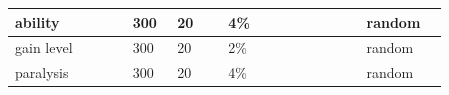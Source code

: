 \begin{longtable}{|>{\RaggedRight}p{0.23462\linewidth}|>{\RaggedRight}p{0.08075\linewidth}|>{\RaggedRight}p{0.10890\linewidth}|>{\RaggedRight}p{0.27027\linewidth}|>{\RaggedRight}p{0.16262\linewidth}|}
ability\footnotemark[71]&\hspace*{0pt}\ignorespaces{}\hspace*{0pt}300&\hspace*{0pt}\ignorespaces{}\hspace*{0pt}20&\hspace*{0pt}\ignorespaces{}\hspace*{0pt}4\%&\hspace*{0pt}\ignorespaces{}\hspace*{0pt}random\footnotemark[72]\\ \hline \hspace*{0pt}\ignorespaces{}\hspace*{0pt}gain level\footnotemark[73]&\hspace*{0pt}\ignorespaces{}\hspace*{0pt}300&\hspace*{0pt}\ignorespaces{}\hspace*{0pt}20&\hspace*{0pt}\ignorespaces{}\hspace*{0pt}2\%&\hspace*{0pt}\ignorespaces{}\hspace*{0pt}random\footnotemark[74]\\ \hline \hspace*{0pt}\ignorespaces{}\hspace*{0pt}paralysis\footnotemark[75]&\hspace*{0pt}\ignorespaces{}\hspace*{0pt}300&\hspace*{0pt}\ignorespaces{}\hspace*{0pt}20&\hspace*{0pt}\ignorespaces{}\hspace*{0pt}4\%&\hspace*{0pt}\ignorespaces{}\hspace*{0pt}random\footnotemark[76]\\ \hline 
\end{longtable}
$\text{ }$\newline{}





